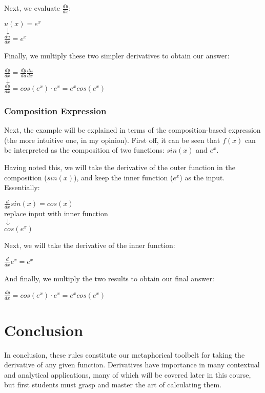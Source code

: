 \documentclass[11pt]{article}
\begin{document}
Next, we evaluate $\frac{du}{dx}$: 

\begin{center}
$ u(x) = e^x $\\
$\downarrow$\\
$\frac{du}{dx} = e^x$
\end{center}

Finally, we multiply these two simpler derivatives to obtain our answer:

\begin{center}
$\frac{dy}{dx} = \frac{dy}{du} \frac{du}{dx}$\\ 
$\downarrow$\\
$\frac{dy}{dx} = cos(e^x) \cdot e^x = e^xcos(e^x)$
\end{center}

\subsubsection{Composition Expression}
Next, the example will be explained in terms of the composition-based expression (the more intuitive one, in my opinion). First off, it can be seen that $f(x)$ can be interpreted as the composition of two functions: $sin(x)$ and $e^x$. 

Having noted this, we will take the derivative of the outer function in the composition ($sin(x)$), and keep the inner function ($e^x$) as the input. Essentially:

\begin{center}
$\frac{d}{dx}sin(x) = cos(x)$\\
replace input with inner function\\
$\downarrow$\\
$cos(e^x)$
\end{center}

Next, we will take the derivative of the inner function:

\begin{center}
$\frac{d}{dx} e^x = e^x$
\end{center}

And finally, we multiply the two results to obtain our final answer:

\begin{center}
$\frac{dy}{dx} = cos(e^x) \cdot e^x = e^xcos(e^x)$
\end{center}


\section{Conclusion}
In conclusion, these rules constitute our metaphorical toolbelt for taking the derivative of any given function. Derivatives have importance in many contextual and analytical applications, many of which will be covered later in this course, but first students must grasp and master the art of calculating them. 
\end{document}

